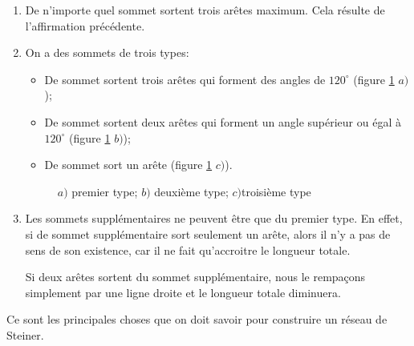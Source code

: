 \documentclass[10pt,a4paper]{article}%
\theoremstyle{theorem}
\theoremstyle{definition}
\begin{document}
\begin{enumerate}
				\item De n'importe quel sommet sortent trois arêtes maximum. Cela résulte de l'affirmation précédente.
				
				\item On a des sommets de trois types:
					\begin{itemize}
						\item De sommet sortent trois arêtes qui forment des angles de $120^\circ$ (figure \ref{types} $a)$);
						\item De sommet sortent deux arêtes qui forment un angle supérieur ou égal à $120^\circ$ (figure \ref{types} $b)$);
						\item De sommet sort un arête (figure \ref{types} $c)$).
					\end{itemize}
				
				\begin{figure}[ht!]				
						\begin{center}
						\caption{$a)$ premier type; $b)$ deuxième type; $c)$troisième type}\label{types}
						\end{center}
										
				\end{figure}
			
				\item Les sommets supplémentaires ne peuvent être que du premier type. En effet, si de sommet supplémentaire sort seulement un arête, alors il n'y a pas de sens de son existence, car il ne fait qu'accroitre le longueur totale. 
				
				Si deux arêtes sortent du sommet supplémentaire, nous le rempaçons simplement par une ligne droite et le longueur totale diminuera.
			\end{enumerate}
	        
	        Ce sont les principales choses que on doit savoir pour construire un réseau de Steiner.
	        
\end{document}
